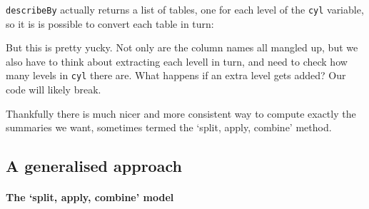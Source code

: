 \documentclass[]{article}
\newenvironment{Shaded}{\begin{snugshade}}{\end{snugshade}}
\newcommand{\KeywordTok}[1]{\textcolor[rgb]{0.13,0.29,0.53}{\textbf{#1}}}
\newcommand{\DecValTok}[1]{\textcolor[rgb]{0.00,0.00,0.81}{#1}}
\newcommand{\StringTok}[1]{\textcolor[rgb]{0.31,0.60,0.02}{#1}}
\newcommand{\OperatorTok}[1]{\textcolor[rgb]{0.81,0.36,0.00}{\textbf{#1}}}
\newcommand{\NormalTok}[1]{#1}
\let\oldparagraph\paragraph
\renewcommand{\paragraph}[1]{\oldparagraph{#1}\mbox{}}
\theoremstyle{definition}
\theoremstyle{definition}
\theoremstyle{definition}
\theoremstyle{remark}
\begin{document}
\texttt{describeBy} actually returns a list of tables, one for each
level of the \texttt{cyl} variable, so it is is possible to convert each
table in turn:

\begin{Shaded}
\end{Shaded}

But this is pretty yucky. Not only are the column names all mangled up,
but we also have to think about extracting each levell in turn, and need
to check how many levels in \texttt{cyl} there are. What happens if an
extra level gets added? Our code will likely break.

Thankfully there is much nicer and more consistent way to compute
exactly the summaries we want, sometimes termed the `split, apply,
combine' method.

\subsection*{A generalised approach}\label{a-generalised-approach}

\hypertarget{split-apply-combine}{\paragraph{\texorpdfstring{The `split,
apply, combine'
model}{The split, apply, combine model}}\label{split-apply-combine}}
\end{document}
